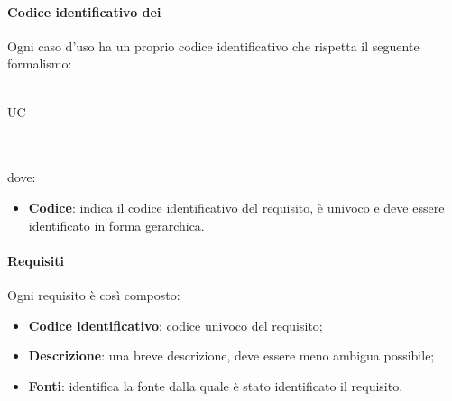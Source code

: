  \paragraph{Codice identificativo dei }
Ogni caso d'uso ha un proprio codice identificativo  che rispetta il seguente formalismo:\\ \\
\centerline{UC\textbraceright{}}
\\ \\dove:
\begin{itemize}
	\item \textbf{Codice}: indica il codice identificativo del requisito, è univoco e deve essere identificato in forma gerarchica.
\end{itemize}
 \paragraph{Requisiti}
 Ogni requisito è così composto:
  \begin{itemize}
  \item \textbf{Codice identificativo}: codice univoco del requisito;
  \item \textbf{Descrizione}: una breve descrizione, deve essere meno ambigua possibile;
  \item \textbf{Fonti}: identifica la fonte dalla quale è stato identificato il requisito.
 \end{itemize}
